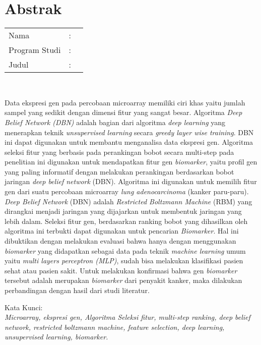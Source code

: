 %
%
%

\chapter*{Abstrak}

\vspace*{0.2cm}

\noindent \begin{tabular}{l l p{10cm}}
	Nama&: & \penulis \\
	Program Studi&: & \program \\
	Judul&: & \judul \\
\end{tabular} \\ 

\vspace*{0.5cm}

\noindent 
Data ekspresi gen pada percobaan microarray memiliki ciri khas yaitu jumlah sampel yang sedikit dengan dimensi fitur yang sangat besar. Algoritma \textit{Deep Belief Network (DBN)}  adalah bagian dari algoritma \textit{deep learning} yang menerapkan teknik \textit{unsupervised learning} secara \textit{greedy layer wise training}. DBN ini dapat digunakan untuk membantu menganalisa data ekspresi gen. Algoritma seleksi fitur yang berbasis pada perankingan bobot secara multi-step pada penelitian ini digunakan untuk mendapatkan fitur gen \textit{biomarker}, yaitu profil gen yang paling informatif dengan melakukan perankingan berdasarkan bobot jaringan \textit{deep belief network} (DBN). Algoritma ini digunakan untuk  memilih fitur gen dari suatu percobaan microarray \textit{lung adenocarcinoma} (kanker paru-paru). \textit{Deep Belief Network} (DBN) adalah \textit{Restricted Boltzmann Machine} (RBM) yang dirangkai menjadi jaringan yang  dijajarkan untuk membentuk jaringan yang lebih dalam. Seleksi fitur gen, berdasarkan ranking bobot yang dihasilkan oleh algoritma ini terbukti dapat digunakan untuk pencarian \textit{Biomarker}. Hal ini dibuktikan dengan melakukan evaluasi bahwa hanya dengan menggunakan \textit{biomarker} yang didapatkan sebagai data pada teknik \textit{machine learning} umum yaitu \textit{multi layers perceptron (MLP)}, sudah bisa melakukan klasifikasi pasien sehat atau pasien sakit. Untuk melakukan konfirmasi bahwa gen \textit{biomarker} tersebut adalah merupakan \textit{biomarker} dari penyakit kanker, maka dilakukan perbandingan dengan hasil dari studi literatur.

\vspace*{0.2cm}

\noindent Kata Kunci: \\ 
\noindent 
\textit{Microarray, ekspresi gen, Algoritma Seleksi fitur, multi-step ranking, deep belief network, restricted boltzmann machine, feature selection, deep learning, unsupervised learning, biomarker.}

\newpage